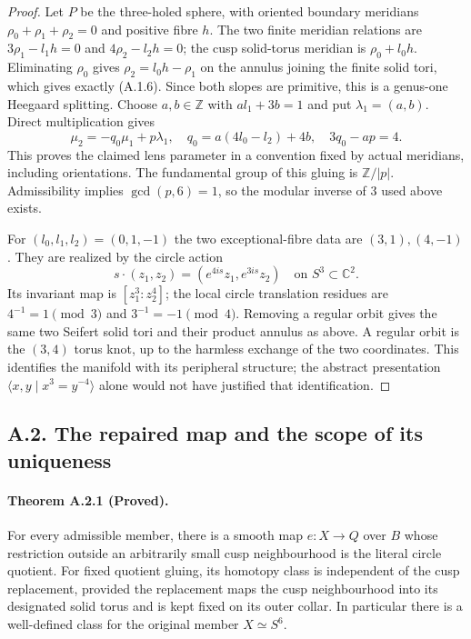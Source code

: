 \begin{proof}
Let $P$ be the three-holed sphere, with oriented boundary
meridians $\rho_0+\rho_1+\rho_2=0$ and positive fibre $h$.
The two finite meridian relations are
$3\rho_1-l_1h=0$ and $4\rho_2-l_2h=0$; the cusp solid-torus
meridian is $\rho_0+l_0h$.  Eliminating $\rho_0$ gives
$\rho_2=l_0h-\rho_1$ on the annulus joining the finite solid
tori, which gives exactly (A.1.6).  Since both slopes are
primitive, this is a genus-one Heegaard splitting.  Choose
$a,b\in\mathbb Z$ with $al_1+3b=1$ and put
$\lambda_1=(a,b)$.  Direct multiplication gives
\[
 \mu_2=-q_0\mu_1+p\lambda_1,
 \quad q_0=a(4l_0-l_2)+4b,
 \quad 3q_0-ap=4.
 \tag{A.1.7}
\]
This proves the claimed lens parameter in a convention fixed
by actual meridians, including orientations.  The fundamental
group of this gluing is $\mathbb Z/|p|$.  Admissibility implies
$\gcd(p,6)=1$, so the modular inverse of $3$ used above exists.

For $(l_0,l_1,l_2)=(0,1,-1)$ the two exceptional-fibre data
are $(3,1),(4,-1)$.  They are realized by the circle action
\[
 s\cdot(z_1,z_2)=(e^{4is}z_1,e^{3is}z_2)
 \quad\text{on } S^3\subset\mathbb C^2.
\]
Its invariant map is $[z_1^3:z_2^4]$; the local circle
translation residues are $4^{-1}=1\pmod3$ and
$3^{-1}=-1\pmod4$.  Removing a regular orbit gives the
same two Seifert solid tori and their product annulus as
above.  A regular orbit is the $(3,4)$ torus knot, up to
the harmless exchange of the two coordinates.  This
identifies the manifold with its peripheral structure;
the abstract presentation $\langle x,y\mid x^3=y^{-4}\rangle$
alone would not have justified that identification.
\end{proof}

\subsection{A.2. The repaired map and the scope of its uniqueness}

\paragraph{Theorem A.2.1 (Proved).}
For every admissible member, there is a smooth map
$e:X\to Q$ over $B$ whose restriction outside an arbitrarily
small cusp neighbourhood is the literal circle quotient.
For fixed quotient gluing, its homotopy class is independent
of the cusp replacement, provided the replacement maps the
cusp neighbourhood into its designated solid torus and is
kept fixed on its outer collar.  In particular there is a
well-defined class for the original member $X\simeq S^6$.

